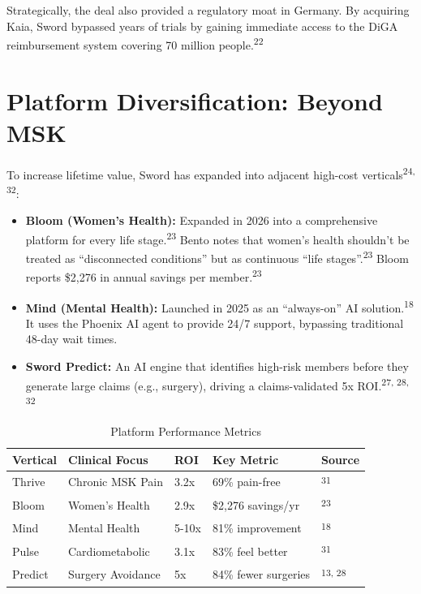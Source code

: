\documentclass[12pt]{article}
\begin{document}
Strategically, the deal also provided a regulatory moat in Germany. By acquiring Kaia, Sword bypassed years of trials by gaining immediate access to the DiGA reimbursement system covering 70 million people.\textsuperscript{22}

\section{Platform Diversification: Beyond MSK}
To increase lifetime value, Sword has expanded into adjacent high-cost verticals\textsuperscript{24, 32}:
\begin{itemize}
    \item \textbf{Bloom (Women's Health):} Expanded in 2026 into a comprehensive platform for every life stage.\textsuperscript{23} Bento notes that women's health shouldn't be treated as ``disconnected conditions'' but as continuous ``life stages''.\textsuperscript{23} Bloom reports \$2,276 in annual savings per member.\textsuperscript{23}
    \item \textbf{Mind (Mental Health):} Launched in 2025 as an ``always-on'' AI solution.\textsuperscript{18} It uses the Phoenix AI agent to provide 24/7 support, bypassing traditional 48-day wait times.
    \item \textbf{Sword Predict:} An AI engine that identifies high-risk members before they generate large claims (e.g., surgery), driving a claims-validated 5x ROI.\textsuperscript{27, 28, 32}
\end{itemize}

\begin{table}[h!]
\centering
\caption{Platform Performance Metrics}
\vspace{0.5em}
\begin{tabular}{lllll}
\toprule
\textbf{Vertical} & \textbf{Clinical Focus} & \textbf{ROI} & \textbf{Key Metric} & \textbf{Source} \\ \midrule
Thrive & Chronic MSK Pain & 3.2x & 69\% pain-free & \textsuperscript{31} \\
Bloom & Women's Health & 2.9x & \$2,276 savings/yr & \textsuperscript{23} \\
Mind & Mental Health & 5-10x & 81\% improvement & \textsuperscript{18} \\
Pulse & Cardiometabolic & 3.1x & 83\% feel better & \textsuperscript{31} \\
Predict & Surgery Avoidance & 5x & 84\% fewer surgeries & \textsuperscript{13, 28} \\ \bottomrule
\end{tabular}
\end{table}
\end{document}
